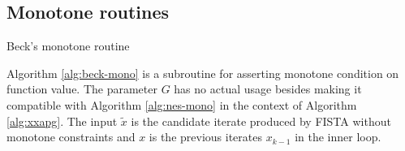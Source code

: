 \documentclass[12pt]{report}
\begin{document}
        \subsection{Monotone routines}
            \begin{algorithm}[H]
                \begin{algorithmic}[1]
                    \caption{Beck's monotone routine}\label{alg:beck-mono}
                \end{algorithmic}
            \end{algorithm}
            \par
            Algorithm \ref{alg:beck-mono} is a subroutine for asserting monotone condition on function value. 
            The parameter $G$ has no actual usage besides making it compatible with Algorithm \ref{alg:nes-mono} in the context of Algorithm \ref{alg:xxapg}. 
            The input $\tilde x$ is the candidate iterate produced by FISTA without monotone constraints and $x$ is the previous iterates $x_{k - 1}$ in the inner loop. 
\end{document}
